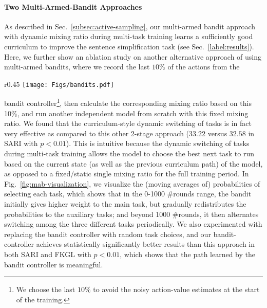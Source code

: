 \documentclass[11pt]{article}
\begin{document}
\paragraph{Two Multi-Armed-Bandit Approaches}
As described in Sec.~\ref{subsec:active-sampling}, our multi-armed bandit approach with dynamic mixing ratio during multi-task training learns a sufficiently good curriculum to improve the sentence simplification task (see Sec.~\ref{label:results}). Here, we further show an ablation study on another alternative approach of using multi-armed bandits, where we record the last $10\%$ of the actions from the 
\begin{wrapfigure}[14]{r}{0.45\textwidth}
  \centering
  \vspace{0pt}
  \texttt{[image: Figs/bandits.pdf]}
  \vspace{-26pt}
  \caption{Task selection probability over training trajectory, predicted by bandit controller.}
	\label{fig:mab-visualization}
\end{wrapfigure}
bandit controller\footnote{We choose the last $10\%$ to avoid the noisy action-value estimates at the start of the training.}, then calculate the corresponding mixing ratio based on this 10\%, and run another independent model from scratch with this fixed mixing ratio. We found that the curriculum-style dynamic switching of tasks is in fact very effective as compared to this other 2-stage approach ($33.22$ versus $32.58$ in SARI with $p<0.01$). This is intuitive because the dynamic switching of tasks during multi-task training allows the model to choose the best next task to run based on the current state (as well as the previous curriculum path) of the model, as opposed to a fixed/static single mixing ratio for the full training period. 
In Fig.~\ref{fig:mab-visualization}, we visualize the (moving averages of) probabilities of selecting each task, which shows that in the 0-1000 \#rounds range, the bandit initially gives higher weight to the main task, but gradually redistributes the probabilities to the auxiliary tasks; and beyond 1000 \#rounds, it then alternates switching among the three different tasks periodically. 
We also experimented with replacing the bandit controller with random task choices, and our bandit-controller achieves statistically significantly better results than this approach in both SARI and FKGL with $p<0.01$, which shows that the path learned by the bandit controller is meaningful.
\end{document}
